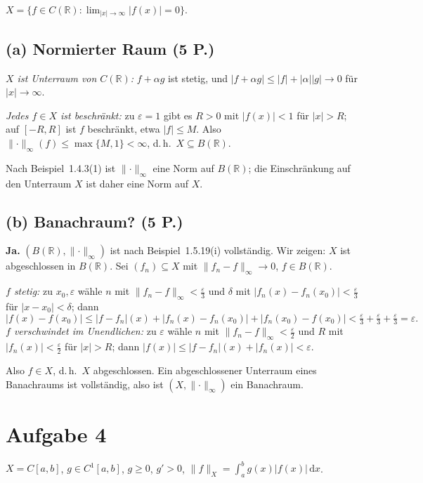\documentclass[11pt,a4paper]{article}
\newcommand{\R}{\mathbb{R}}
\newcommand{\norm}[1]{\lVert #1 \rVert}
\newcommand{\abs}[1]{\lvert #1 \rvert}
\newcommand{\ninf}{\norm{\cdot}_\infty}
\newcommand{\dm}{\,\mathrm{d}}
\begin{document}
\noindent
$X=\{f\in C(\R):\lim_{\abs{x}\to\infty}\abs{f(x)}=0\}$.

\subsection*{(a) Normierter Raum \hfill (5 P.)}
\emph{$X$ ist Unterraum von $C(\R)$:} $f+\alpha g$ ist stetig, und
$\abs{f+\alpha g}\le\abs{f}+\abs{\alpha}\abs{g}\to0$ für $\abs{x}\to\infty$.

\emph{Jedes $f\in X$ ist beschränkt:} zu $\varepsilon=1$ gibt es $R>0$ mit
$\abs{f(x)}<1$ für $\abs{x}>R$; auf $[-R,R]$ ist $f$ beschränkt, etwa
$\abs{f}\le M$. Also $\ninf(f)\le\max\{M,1\}<\infty$, d.\,h.\ $X\subseteq B(\R)$.

Nach Beispiel~1.4.3(1) ist $\ninf$ eine Norm auf $B(\R)$; die Einschränkung auf
den Unterraum $X$ ist daher eine Norm auf $X$.

\subsection*{(b) Banachraum? \hfill (5 P.)}
\textbf{Ja.} $(B(\R),\ninf)$ ist nach Beispiel~1.5.19(i) vollständig. Wir zeigen:
$X$ ist abgeschlossen in $B(\R)$. Sei $(f_n)\subseteq X$ mit
$\norm{f_n-f}_\infty\to0$, $f\in B(\R)$.

\emph{$f$ stetig:} zu $x_0,\varepsilon$ wähle $n$ mit
$\norm{f_n-f}_\infty<\tfrac\varepsilon3$ und $\delta$ mit
$\abs{f_n(x)-f_n(x_0)}<\tfrac\varepsilon3$ für $\abs{x-x_0}<\delta$; dann
\[
  \abs{f(x)-f(x_0)}\le\abs{f-f_n}(x)+\abs{f_n(x)-f_n(x_0)}+\abs{f_n(x_0)-f(x_0)}
  <\tfrac\varepsilon3+\tfrac\varepsilon3+\tfrac\varepsilon3=\varepsilon .
\]
\emph{$f$ verschwindet im Unendlichen:} zu $\varepsilon$ wähle $n$ mit
$\norm{f_n-f}_\infty<\tfrac\varepsilon2$ und $R$ mit $\abs{f_n(x)}<\tfrac\varepsilon2$
für $\abs{x}>R$; dann $\abs{f(x)}\le\abs{f-f_n}(x)+\abs{f_n(x)}<\varepsilon$.

Also $f\in X$, d.\,h.\ $X$ abgeschlossen. Ein abgeschlossener Unterraum eines
Banachraums ist vollständig, also ist $(X,\ninf)$ ein Banachraum.

\section*{Aufgabe 4}

\noindent
$X=C[a,b]$, $g\in C^1[a,b]$, $g\ge0$, $g'>0$, $\norm{f}_X=\int_a^b g(x)\abs{f(x)}\dm x$.
\end{document}
